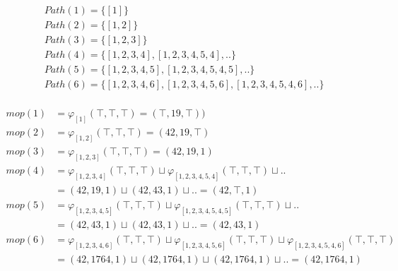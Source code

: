 \documentclass[fleqn,12pt]{article}
\begin{document}

\begin{align*}
&Path(1) = \{[1]\}\\
&Path(2) = \{[1,2]\}\\
&Path(3) = \{[1,2,3]\}\\
&Path(4) = \{[1,2,3,4],[1,2,3,4,5,4],..\}\\
&Path(5) = \{[1,2,3,4,5],[1,2,3,4,5,4,5],..\}\\
&Path(6) = \{[1,2,3,4,6],[1,2,3,4,5,6],[1,2,3,4,5,4,6],..\}\\
\end{align*}

\begin{align*}
	mop(1)&=\varphi_{[1]}(\top,\top,\top)=(\top, 19, \top))\\
	mop(2)&=\varphi_{[1,2]}(\top,\top,\top)=(42, 19, \top)\\
	mop(3)&=\varphi_{[1,2,3]}(\top,\top,\top)=(42, 19, 1)\\
	mop(4)&=\varphi_{[1,2,3,4]}(\top,\top,\top) \sqcup \varphi_{[1,2,3,4,5,4]}(\top,\top,\top) \sqcup .. \\
	&= (42,19,1) \sqcup (42,43,1) \sqcup .. = (42,\top,1)\\
	mop(5)&=\varphi_{[1,2,3,4,5]}(\top,\top,\top) \sqcup \varphi_{[1,2,3,4,5,4,5]}(\top,\top,\top) \sqcup .. \\
	&=(42, 43, 1) \sqcup (42,43,1) \sqcup .. = (42,43,1)\\
	mop(6)&=\varphi_{[1,2,3,4,6]}(\top,\top,\top) \sqcup \varphi_{[1,2,3,4,5,6]}(\top,\top,\top) \sqcup \varphi_{[1,2,3,4,5,4,6]}(\top,\top,\top)\\
	&=(42, 1764, 1) \sqcup (42,1764,1) \sqcup (42,1764,1) \sqcup .. = (42,1764,1)\\
\end{align*}
\end{document}
